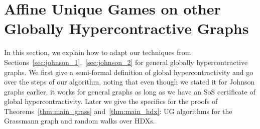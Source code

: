 \documentclass[11pt]{article}
\theoremstyle{definition}
\begin{document}
\section{Affine Unique Games on other Globally Hypercontractive Graphs}\label{sec:other_graphs}
In this section, we explain how to adapt our techniques from Sections~\ref{sec:johnson_1},~\ref{sec:johnson_2} for 
general globally hypercontractive graphs. We first give a semi-formal definition of global hypercontractivity and go over the steps of our algorithm, noting that even though we stated it for Johnson graphs earlier, it works for general graphs as long as we have an SoS certificate of global hypercontractivity. Later we give the specifics for the proofs of Theorems~\ref{thm:main_grass} and~\ref{thm:main_hdx}: UG algorithms for the Grassmann graph and random walks over HDXs.
\end{document}
